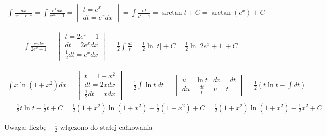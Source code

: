 
\begin{gather*}
  \int \frac{dx}{e^x+e^{-x}}
  = \int \frac{e^xdx}{e^{2x}+1} =
  \begin{vmatrix}
    t=e^x \\
    dt=e^xdx
  \end{vmatrix}
  = \int \frac{\mbox{d}t}{t^2+1}
  = \arctan t + C
  = \arctan (e^x) + C
\end{gather*}


\begin{gather*}
  \int \frac{e^xdx}{2e^x+1} =
  \begin{vmatrix}
    t=2e^x+1 \\
    dt =2e^xdx \\
    \frac{1}{2}dt=e^xdx
  \end{vmatrix}
  = \frac{1}{2} \int \frac{dt}{t}
  = \frac{1}{2} \ln|t| + C
  = \frac{1}{2}\ln|2e^x+1|+C
\end{gather*}


\begin{gather*}
  \int x\ln(1+x^2)dx =
  \begin{vmatrix}
    t=1+x^2 \\
    dt=2xdx \\
    \frac{1}{2}dt=xdx
  \end{vmatrix}
  = \frac{1}{2} \int \ln t \ dt =
  \begin{vmatrix}
    u=\ln t & dv=dt \\
    du=\frac{dt}{t} & v=t
  \end{vmatrix}
  = \frac{1}{2} \left( t\ln t - \int dt \right) = \\
  = \frac{1}{2}t\ln t - \frac{1}{2}t + C
  = \frac{1}{2}(1+x^2)\ln(1+x^2)-\frac{1}{2}(1+x^2)+C
  = \frac{1}{2}(1+x^2)\ln(1+x^2)-\frac{1}{2}x^2+C
\end{gather*}

Uwaga: liczbę $-\frac{1}{2}$ włączono do stałej całkowania



